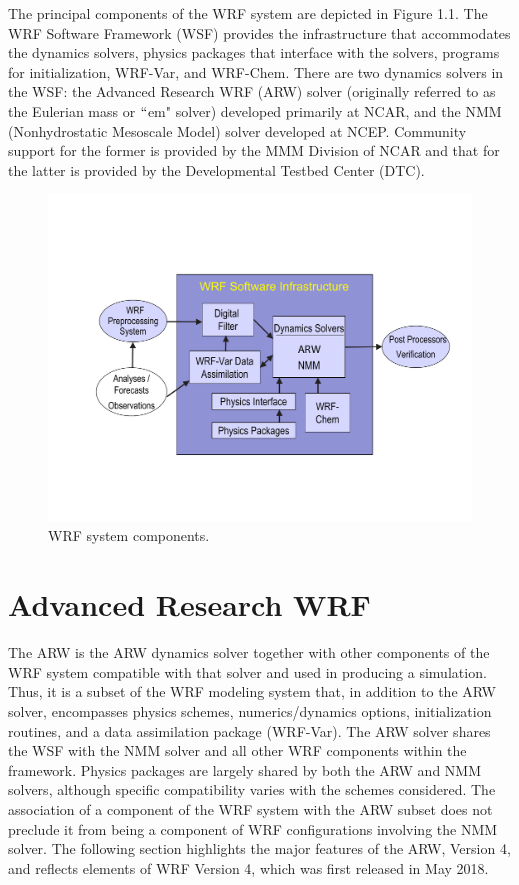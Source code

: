 The principal components of the WRF system are depicted in Figure 1.1. 
The WRF Software Framework (WSF) provides the infrastructure 
that accommodates the dynamics solvers, physics packages 
that interface with the solvers, programs for initialization,   
WRF-Var, and WRF-Chem.  There are two dynamics solvers in the WSF: the 
Advanced Research WRF (ARW) solver (originally referred to
as the Eulerian mass or $``$em" solver) developed primarily at NCAR, and
the NMM (Nonhydrostatic Mesoscale Model) solver developed at NCEP.
Community support for the former is provided by the MMM Division of NCAR 
and that for the latter is provided by the Developmental Testbed Center (DTC).


%
%
\begin{figure}
  \centering
  \includegraphics[width=6.5in]{figures/component.pdf}
  \caption{\label{figure:1}WRF system components.}
\end{figure}

\section {Advanced Research WRF}

The ARW is the ARW dynamics solver together with other
components of the WRF system compatible with that solver and 
used in producing a simulation.  Thus, it is a subset of 
the WRF modeling system that, in addition to the ARW solver, 
encompasses physics schemes, numerics/dynamics options, 
initialization routines, and a data assimilation package (WRF-Var).  
The ARW solver shares the WSF with the NMM solver and all other 
WRF components within the framework.  Physics packages are 
largely shared by both the ARW and NMM solvers, although specific 
compatibility varies with the schemes considered.  
The association of a component of the WRF system with 
the ARW subset does not preclude it from being a
component of WRF configurations involving the NMM solver.  
The following section highlights the major features of the 
ARW, Version 4, and reflects elements of WRF Version 4, 
which was first released in May 2018.

